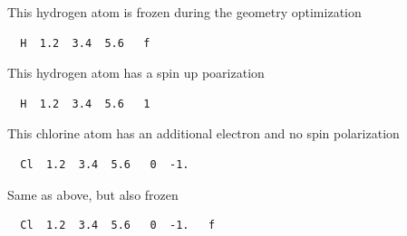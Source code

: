 \documentclass[a4paper,11pt]{report}
\begin{document}
This hydrogen atom is frozen during the geometry optimization
\begin{verbatim}
  H  1.2  3.4  5.6   f
\end{verbatim}

This hydrogen atom has a spin up poarization
\begin{verbatim}
  H  1.2  3.4  5.6   1
\end{verbatim}

This chlorine atom has an additional electron and no spin polarization
\begin{verbatim}
  Cl  1.2  3.4  5.6   0  -1.
\end{verbatim}

Same as above, but also frozen
\begin{verbatim}
  Cl  1.2  3.4  5.6   0  -1.   f
\end{verbatim}
\end{document}
